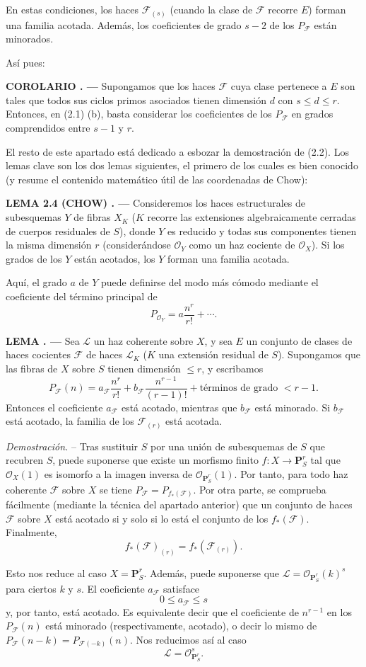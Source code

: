 \documentclass[11pt,twoside,openany]{book}
\numberwithin{equation}{section}
\newcommand{\src}[1]{%
  \phantomsection\hypertarget{src:#1}{}%
  \marginpar{\raggedleft\footnotesize\sffamily #1}%
}
\theoremstyle{plain}
\theoremstyle{definition}
\theoremstyle{remark}
\newcommand{\result}[2]{%
  \par\medskip\noindent\textbf{#1%
  \if\relax\detokenize{#2}\relax\else\space#2\fi. ---}\enspace
}
\newcommand{\FgaUnitKey}{frontmatter}
\renewcommand{\src}[1]{%
  \phantomsection\hypertarget{src:\FgaUnitKey:#1}{}%
  \marginpar{\raggedleft\footnotesize\sffamily #1}%
}
\theoremstyle{plain}
\theoremstyle{definition}
\theoremstyle{remark}
\begin{document}
En estas condiciones, los haces $\mathcal F_{(s)}$ (cuando la clase de
$\mathcal F$ recorre $E$) forman una familia acotada. Además, los coeficientes
de grado $s-2$ de los $P_{\mathcal F}$ están minorados.
\src{255}
Así pues:

\result{COROLARIO}{2.3} Supongamos que los haces $\mathcal F$ cuya clase
pertenece a $E$ son tales que todos sus ciclos primos asociados tienen
dimensión $d$ con $s\leq d\leq r$. Entonces, en (2.1) (b), basta considerar los
coeficientes de los $P_{\mathcal F}$ en grados comprendidos entre $s-1$ y $r$.

El resto de este apartado está dedicado a esbozar la demostración de (2.2).
Los lemas clave son los dos lemas siguientes, el primero de los cuales es bien
conocido (y resume el contenido matemático útil de las coordenadas de Chow):

\result{LEMA 2.4 (CHOW)}{} Consideremos los haces estructurales de subesquemas
$Y$ de fibras $X_K$ ($K$ recorre las extensiones algebraicamente cerradas de
cuerpos residuales de $S$), donde $Y$ es reducido y todas sus componentes
tienen la misma dimensión $r$ (considerándose $\mathcal O_Y$ como un haz
cociente de $\mathcal O_X$). Si los grados de los $Y$ están acotados, los $Y$
forman una familia acotada.

Aquí, el grado $a$ de $Y$ puede definirse del modo más cómodo mediante el
coeficiente del término principal de
\[
P_{\mathcal O_Y}=a\frac{n^r}{r!}+\cdots.
\]

\result{LEMA}{2.5} Sea $\mathcal L$ un haz coherente sobre $X$, y sea $E$ un
conjunto de clases de haces cocientes $\mathcal F$ de haces $\mathcal L_K$
($K$ una extensión residual de $S$). Supongamos que las fibras de $X$ sobre
$S$ tienen dimensión $\leq r$, y escribamos
\[
P_{\mathcal F}(n)=a_{\mathcal F}\frac{n^r}{r!}
+b_{\mathcal F}\frac{n^{r-1}}{(r-1)!}
+\text{términos de grado $<r-1$}.
\]
Entonces el coeficiente $a_{\mathcal F}$ está acotado, mientras que
$b_{\mathcal F}$ está minorado. Si $b_{\mathcal F}$ está acotado, la familia
de los $\mathcal F_{(r)}$ está acotada.

\emph{Demostración.} -- Tras sustituir $S$ por una unión de subesquemas de
$S$ que recubren $S$, puede suponerse que existe un morfismo finito
$f:X\longrightarrow\mathbf P^r_S$ tal que $\mathcal O_X(1)$ es isomorfo a la
imagen inversa de $\mathcal O_{\mathbf P^r_S}(1)$. Por tanto, para todo haz
coherente $\mathcal F$ sobre $X$ se tiene
$P_{\mathcal F}=P_{f_*(\mathcal F)}$. Por otra parte, se comprueba fácilmente
(mediante la técnica del apartado anterior) que un conjunto de haces
$\mathcal F$ sobre $X$ está acotado si y solo si lo está el conjunto de los
$f_*(\mathcal F)$. Finalmente,
\[
f_*(\mathcal F)_{(r)}=f_*(\mathcal F_{(r)}).
\]
\src{256}
Esto nos reduce al caso $X=\mathbf P^r_S$. Además, puede suponerse que
$\mathcal L=\mathcal O_{\mathbf P^r_S}(k)^s$ para ciertos $k$ y $s$. El
coeficiente $a_{\mathcal F}$ satisface
\[
0\leq a_{\mathcal F}\leq s
\]
y, por tanto, está acotado. Es equivalente decir que el coeficiente de
$n^{r-1}$ en los $P_{\mathcal F}(n)$ está minorado (respectivamente, acotado),
o decir lo mismo de
$P_{\mathcal F}(n-k)=P_{\mathcal F(-k)}(n)$. Nos reducimos así al caso
\[
\mathcal L=\mathcal O_{\mathbf P^r_S}^{s}.
\]
\end{document}
